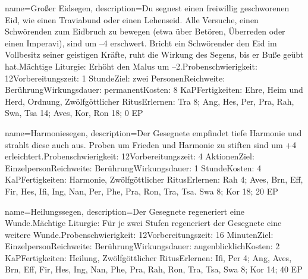 {
    name={Großer Eidsegen},
    description={Du segnest einen freiwillig geschworenen Eid, wie einen Traviabund oder einen Lehens­eid. Alle Versuche, einen Schwörenden zum Eidbruch zu bewegen (etwa über Betören, Überreden oder einen Imperavi), sind um –4 erschwert. Bricht ein Schwörender den Eid im Vollbesitz seiner geistigen Kräfte, ruht die Wirkung des Segens, bis er Buße geübt hat.\newline Mächtige Liturgie: Erhöht den Malus um –2.\newline Probenschwierigkeit: 12\newline Vorbereitungszeit: 1 Stunde\newline Ziel: zwei Personen\newline Reichweite: Berührung\newline Wirkungsdauer: permanent\newline Kosten: 8 KaP\newline Fertigkeiten: Ehre, Heim und Herd, Ordnung, Zwölfgöttlicher Ritus\newline Erlernen: Tra 8; Ang, Hes, Per, Pra, Rah, Swa, Tsa 14; Aves, Kor, Ron 18; 0 EP}
}


{
    name={Harmoniesegen},
    description={Der Gesegnete empfindet tiefe Harmonie und strahlt diese auch aus. Proben um Frieden und Harmonie zu stiften sind um +4 erleichtert.\newline Probenschwierigkeit: 12\newline Vorbereitungszeit: 4 Aktionen\newline Ziel: Einzelperson\newline Reichweite: Berührung\newline Wirkungsdauer: 1 Stunde\newline Kosten: 4 KaP\newline Fertigkeiten: Harmonie, Zwölfgöttlicher Ritus\newline Erlernen: Rah 4; Aves, Brn, Eff, Fir, Hes, Ifi, Ing, Nan, Per, Phe, Pra, Ron, Tra, Tsa. Swa 8; Kor 18; 20 EP}
}


{
    name={Heilungssegen},
    description={Der Gesegnete regeneriert eine Wunde.\newline Mächtige Liturgie: Für je zwei Stufen regeneriert der Gesegnete eine weitere Wunde.\newline Probenschwierigkeit: 12\newline Vorbereitungszeit: 16 Minuten\newline Ziel: Einzelperson\newline Reichweite: Berührung\newline Wirkungsdauer: augenblicklich\newline Kosten: 2 KaP\newline Fertigkeiten: Heilung, Zwölfgöttlicher Ritus\newline Erlernen: Ifi, Per 4; Ang, Aves, Brn, Eff, Fir, Hes, Ing, Nan, Phe, Pra, Rah, Ron, Tra, Tsa, Swa 8; Kor 14; 40 EP}
}


